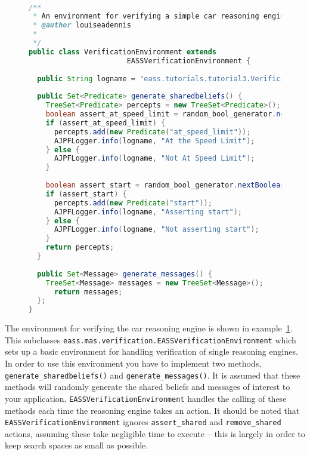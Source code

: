 \begin{figure}[!htpb]
\begin{ourexample}
\label{code:EASSverifenvironment} \quad \\
\begin{lstlisting}[basicstyle=\sffamily,style=easslisting,language=Java]
/**
 * An environment for verifying a simple car reasoning engine.
 * @author louiseadennis
 *
 */
public class VerificationEnvironment extends 
                       EASSVerificationEnvironment {
			
  public String logname = "eass.tutorials.tutorial3.VerificationEnvironment";
	
  public Set<Predicate> generate_sharedbeliefs() {
    TreeSet<Predicate> percepts = new TreeSet<Predicate>();
    boolean assert_at_speed_limit = random_bool_generator.nextBoolean();
    if (assert_at_speed_limit) {
      percepts.add(new Predicate("at_speed_limit"));
      AJPFLogger.info(logname, "At the Speed Limit");
    } else {
      AJPFLogger.info(logname, "Not At Speed Limit");
    }
		
    boolean assert_start = random_bool_generator.nextBoolean();
    if (assert_start) {
      percepts.add(new Predicate("start"));
      AJPFLogger.info(logname, "Asserting start");
    } else {
      AJPFLogger.info(logname, "Not asserting start");
    }
    return percepts;
  }
	
  public Set<Message> generate_messages() {
    TreeSet<Message> messages = new TreeSet<Message>();
      return messages;
  };
}
\end{lstlisting}
\end{ourexample}
\end{figure}
\begin{sloppypar}
The environment for verifying the car reasoning engine is shown in example~\ref{code:EASSverifenvironment}.  This subclasses \texttt{eass.mas.verification.EASSVerificationEnvironment} which sets up a basic environment for handling verification of single reasoning engines.  In order to use this environment you have to implement two methods, \texttt{generate\_sharedbeliefs()} and \texttt{generate\_messages()}.  It is assumed that these methods will randomly generate the shared beliefs and messages of interest to your application.  \texttt{EASSVerificationEnvironment} handles the calling of these methods each time the reasoning engine takes an action.  It should be noted that \texttt{EASSVerificationEnvironment} ignores \lstinline{assert_shared} and \lstinline{remove_shared} actions, assuming these take negligible time to execute -- this is largely in order to keep search spaces as small as possible.
\end{sloppypar}

